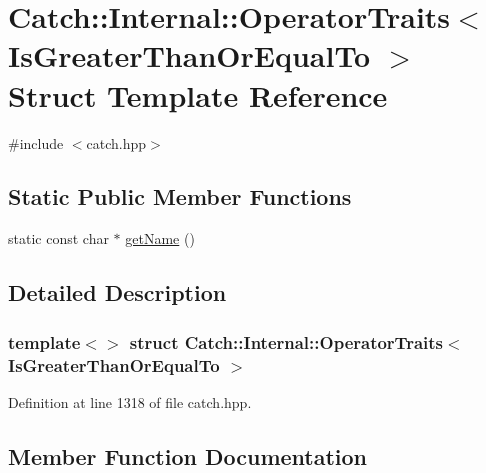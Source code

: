 \hypertarget{struct_catch_1_1_internal_1_1_operator_traits_3_01_is_greater_than_or_equal_to_01_4}{}\section{Catch\+:\+:Internal\+:\+:Operator\+Traits$<$ Is\+Greater\+Than\+Or\+Equal\+To $>$ Struct Template Reference}
\label{struct_catch_1_1_internal_1_1_operator_traits_3_01_is_greater_than_or_equal_to_01_4}


{\ttfamily \#include $<$catch.\+hpp$>$}

\subsection*{Static Public Member Functions}
\begin{DoxyCompactItemize}
\item 
static const char $\ast$ \hyperlink{struct_catch_1_1_internal_1_1_operator_traits_3_01_is_greater_than_or_equal_to_01_4_a76b6f6b0dbaf7d19ebb1b4b4891e719e}{get\+Name} ()
\end{DoxyCompactItemize}


\subsection{Detailed Description}
\subsubsection*{template$<$$>$\newline
struct Catch\+::\+Internal\+::\+Operator\+Traits$<$ Is\+Greater\+Than\+Or\+Equal\+To $>$}



Definition at line 1318 of file catch.\+hpp.



\subsection{Member Function Documentation}
\hypertarget{struct_catch_1_1_internal_1_1_operator_traits_3_01_is_greater_than_or_equal_to_01_4_a76b6f6b0dbaf7d19ebb1b4b4891e719e}{}\label{struct_catch_1_1_internal_1_1_operator_traits_3_01_is_greater_than_or_equal_to_01_4_a76b6f6b0dbaf7d19ebb1b4b4891e719e} 
